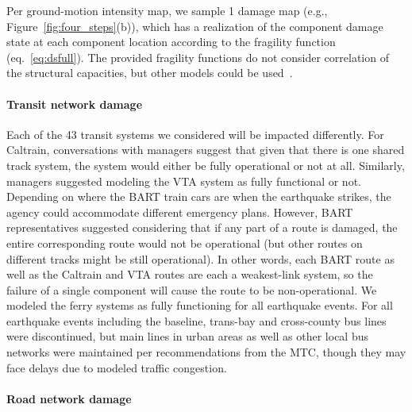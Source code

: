Per ground-motion intensity map, we sample 1 damage map (e.g., Figure~\ref{fig:four_steps}{(b)}), which has a realization of the component damage state at each component location according to the fragility function (eq.~\ref{eq:dsfull}). The provided fragility functions do not consider correlation of the structural capacities, but other models could be used~\cite[e.g.,][]{lee_uncertainty_2007}.

\paragraph{Transit network damage}
\label{sec:transitDamage}
Each of the 43 transit systems we considered will be impacted differently. For Caltrain, conversations with managers suggest that given that there is one shared track system, the system would either be fully operational or  not at all. Similarly, managers suggested modeling the VTA system as fully functional or not. Depending on where the BART train cars are when the earthquake strikes, the agency could accommodate different emergency plans. However, BART representatives suggested considering that if any part of a route is damaged, the entire corresponding route would not be operational (but other routes on different tracks might be still operational).  In other words, each BART route as well as the Caltrain and VTA routes are each a weakest-link system,  so the failure of a single component  will cause the route to be non-operational. We modeled the ferry systems as fully functioning for all earthquake events. For all earthquake events including the baseline, trans-bay and cross-county bus lines were discontinued, but main lines in urban areas as well as other local bus networks were maintained per recommendations from the MTC, though they may face delays due to modeled traffic congestion. 

\paragraph{Road network damage}


